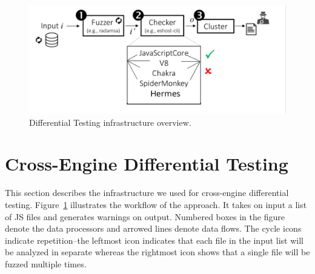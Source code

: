 \documentclass[smallextended]{svjour3}
\begin{document}





\begin{figure}[t]
  \centering
  \includegraphics[trim=0 350 0 0,clip,width=1.0\textwidth]{diff-testing-runtimes}
  \vspace{-5ex}
  \caption{\label{fig:workflow}Differential Testing infrastructure overview.}
  \vspace{-2ex}
\end{figure}

\section{Cross-Engine Differential Testing}
\label{sec:design}

This section describes the infrastructure we used for cross-engine
differential testing. Figure~\ref{fig:workflow} illustrates the
workflow of the approach. It takes on input a list of JS files and
generates warnings on output. Numbered boxes in the figure denote the
data processors and arrowed lines denote data flows. The cycle icons
indicate repetition--the leftmost icon indicates that each file in the
input list will be analyzed in separate whereas the rightmost icon
shows that a single file will be fuzzed multiple times.
\end{document}
